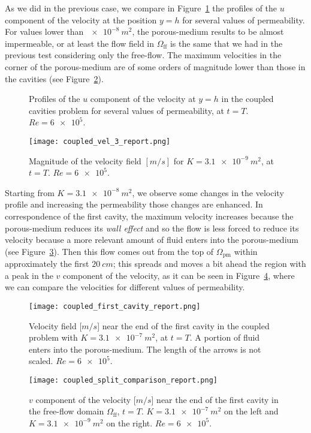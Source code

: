 As we did in the previous case, we compare in Figure~\ref{fig:md_wall_velocities} the profiles of the $u$ component of the velocity at the position $y=h$ for several values of permeability. For values lower than $\SI{e-8}{m^2}$, the porous-medium results to be almost impermeable, or at least the flow field in $\Omega_\text{ff}$ is the 
same that we had in the previous test considering only the free-flow. The maximum velocities in the 
corner of the porous-medium are of some orders of magnitude lower than those in 
the cavities (see Figure~\ref{fig:coupled_vel_3}).
\begin{figure}
	\centering
	
	\caption[Profiles of the $u$ component of the velocity at $y=h$ in the coupled cavities problem]{Profiles of the $u$ component of the velocity at $y=h$ in the coupled cavities problem for several values of permeability, at $t=T$. $Re = \num{6e5}$.}
	\label{fig:md_wall_velocities}
\end{figure}
\begin{figure}
	\centering
	\texttt{[image: coupled\_vel\_3\_report.png]}
	\caption[Magnitude of the velocity field in the coupled problem]{Magnitude of the velocity field $[\si{m/s}]$ for $K=\SI{3.1e-9}{m^2}$, at $t=T$. $Re=\num{6e5}$.}
	\label{fig:coupled_vel_3}
\end{figure}

Starting from $K=\SI{3.1e-8}{m^2}$, we observe some changes in the velocity 
profile and increasing the permeability those changes are enhanced. In 
correspondence of the first cavity, the maximum velocity increases because the 
porous-medium reduces its \emph{wall effect} and so the flow is less forced to reduce 
its velocity because a more relevant amount of fluid enters into the 
porous-medium (see Figure~\ref{fig:coupled_arrows}). Then this flow comes out 
from the top of $\Omega_\text{pm}$ within approximately the first $\SI{20}{cm}$; this spreads and 
moves a bit ahead the region with a peak in the $v$ component of the velocity, as 
it can be seen in Figure~\ref{fig:coupled_vel_split}, where we can compare the 
velocities for different values of permeability.
\begin{figure}
	\centering
	\texttt{[image: coupled\_first\_cavity\_report.png]}
	\caption[Velocity field near the end of the first cavity in the coupled problem]{Velocity field [$\si{m/s}$] near the end of the first cavity in the coupled problem with $K=\SI{3.1e-7}{m^2}$, at $t=T$. A portion of fluid enters into the porous-medium. The length of the arrows is not scaled. $Re=\num{6e5}$.}
	\label{fig:coupled_arrows}
\end{figure}
\begin{figure}
	\centering
	\texttt{[image: coupled\_split\_comparison\_report.png]}
	\caption[$v$ component of the velocity near the end of the first cavity in the coupled problem]{$v$ component of the velocity [$\si{m/s}$] near the end of the first cavity in the free-flow domain $\Omega_\text{ff}$, $t=T$. $K = \SI{3.1e-7}{m^2}$ on the left and $K = \SI{3.1e-9}{m^2}$ on the right. $Re=\num{6e5}$.}
	\label{fig:coupled_vel_split}
\end{figure}

